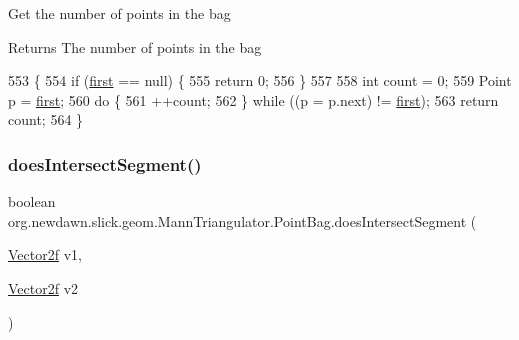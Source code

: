 Get the number of points in the bag

\begin{DoxyReturn}{Returns}
The number of points in the bag 
\end{DoxyReturn}

\begin{DoxyCode}
553                                  \{
554             \textcolor{keywordflow}{if} (\mbox{\hyperlink{classorg_1_1newdawn_1_1slick_1_1geom_1_1_mann_triangulator_1_1_point_bag_a120e5163711d94563be103af953fe059}{first}} == null) \{
555                 \textcolor{keywordflow}{return} 0;
556             \}
557 
558             \textcolor{keywordtype}{int} count = 0;
559             Point p = \mbox{\hyperlink{classorg_1_1newdawn_1_1slick_1_1geom_1_1_mann_triangulator_1_1_point_bag_a120e5163711d94563be103af953fe059}{first}};
560             \textcolor{keywordflow}{do} \{
561                 ++count;
562             \} \textcolor{keywordflow}{while} ((p = p.next) != \mbox{\hyperlink{classorg_1_1newdawn_1_1slick_1_1geom_1_1_mann_triangulator_1_1_point_bag_a120e5163711d94563be103af953fe059}{first}});
563             \textcolor{keywordflow}{return} count;
564         \}
\end{DoxyCode}
\mbox{\label{classorg_1_1newdawn_1_1slick_1_1geom_1_1_mann_triangulator_1_1_point_bag_a8db4f4ea9b3ed93c73fa322fe1f28ebc}} 
\subsubsection{\texorpdfstring{does\+Intersect\+Segment()}{doesIntersectSegment()}}
{\footnotesize\ttfamily boolean org.\+newdawn.\+slick.\+geom.\+Mann\+Triangulator.\+Point\+Bag.\+does\+Intersect\+Segment (\begin{DoxyParamCaption}\item[{\mbox{\hyperlink{classorg_1_1newdawn_1_1slick_1_1geom_1_1_vector2f}{Vector2f}}}]{v1,  }\item[{\mbox{\hyperlink{classorg_1_1newdawn_1_1slick_1_1geom_1_1_vector2f}{Vector2f}}}]{v2 }\end{DoxyParamCaption})\hspace{0.3cm}{\ttfamily [inline]}}


